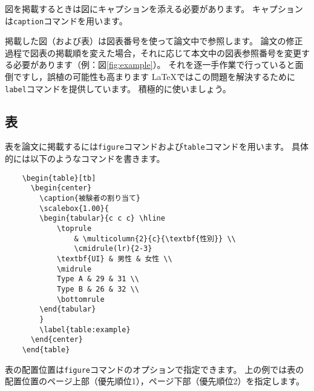 図を掲載するときは図にキャプションを添える必要があります。
キャプションは{\tt caption}コマンドを用います。

掲載した図（および表）は図表番号を使って論文中で参照します。
論文の修正過程で図表の掲載順を変えた場合，それに応じて本文中の図表参照番号を変更する必要があります（例：図\ref{fig:example}）。
それを逐一手作業で行っていると面倒ですし，誤植の可能性も高まります
LaTeXではこの問題を解決するために{\tt label}コマンドを提供しています。
積極的に使いましょう。


\subsection{表}
表を論文に掲載するには{\tt figure}コマンドおよび{\tt table}コマンドを用います。
具体的には以下のようなコマンドを書きます。

\begin{verbatim}
    \begin{table}[tb]
      \begin{center}
        \caption{被験者の割り当て}
        \scalebox{1.00}{
        \begin{tabular}{c c c} \hline
            \toprule
                & \multicolumn{2}{c}{\textbf{性別}} \\
                \cmidrule(lr){2-3}
            \textbf{UI} & 男性 & 女性 \\
            \midrule
            Type A & 29 & 31 \\
            Type B & 26 & 32 \\
            \bottomrule
        \end{tabular}
        }
        \label{table:example}
      \end{center}
    \end{table}
\end{verbatim}
表の配置位置は{\tt figure}コマンドのオプションで指定できます。
上の例では表の配置位置のページ上部（優先順位1），ページ下部（優先順位2）を指定します。

\begin{table}[tb]
  \begin{center}
    \caption{被験者の割り当て．}
    \label{table:example}
  \end{center}
\end{table}
